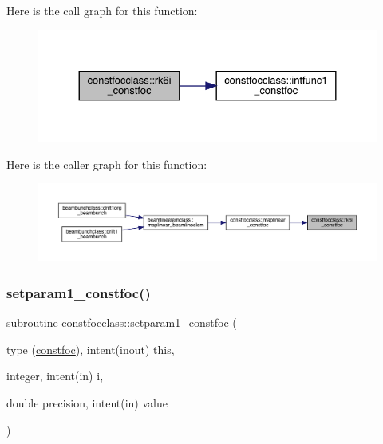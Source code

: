 Here is the call graph for this function\+:\nopagebreak
\begin{figure}[H]
\begin{center}
\leavevmode
\includegraphics[width=330pt]{namespaceconstfocclass_a25aa498c0852e2952880172b61f0f034_cgraph}
\end{center}
\end{figure}
Here is the caller graph for this function\+:\nopagebreak
\begin{figure}[H]
\begin{center}
\leavevmode
\includegraphics[width=350pt]{namespaceconstfocclass_a25aa498c0852e2952880172b61f0f034_icgraph}
\end{center}
\end{figure}
\mbox{\label{namespaceconstfocclass_a14001bee7b5f9c4138d8042dcc94955c}} 
\subsubsection{\texorpdfstring{setparam1\_constfoc()}{setparam1\_constfoc()}}
{\footnotesize\ttfamily subroutine constfocclass\+::setparam1\+\_\+constfoc (\begin{DoxyParamCaption}\item[{type (\mbox{\hyperlink{namespaceconstfocclass_structconstfocclass_1_1constfoc}{constfoc}}), intent(inout)}]{this,  }\item[{integer, intent(in)}]{i,  }\item[{double precision, intent(in)}]{value }\end{DoxyParamCaption})}

